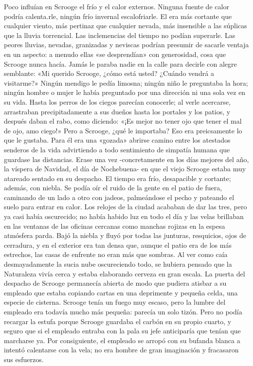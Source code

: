 \documentclass{novela}
\begin{document}
 Poco influían en Scrooge el frío y el calor externos. Ninguna fuente de calor podría calenta.rle, ningún frío invernal escalofriarle. El era más cortante que cualquier viento, más pertinaz que cualquier nevada, más insensible a las súplicas que la lluvia torrencial. Las inclemencias del tiempo no podían superarle. Las peores lluvias, nevadas, granizadas y neviscas podrían presumir de sacarle ventaja en un aspecto: a menudo ellas «se desprendían» con generosidad, cosa que Scrooge nunca hacía.
 Jamás le paraba nadie en la calle para decirle con alegre semblante: «Mi querido Scrooge, ¿cómo está usted? ¿Cuándo vendrá a visitarme?» Ningún mendigo le pedía limosna; ningún niño le preguntaba la hora; ningún hombre o mujer le había preguntado por una dirección ni una sola vez en su vida. Hasta los perros de los ciegos parecían conocerle; al verle acercarse, arrastraban precipitadamente a sus dueños hasta los portales y los patios, y después daban el rabo, como diciendo: «¡Es mejor no tener ojo que tener el mal de ojo, amo ciego!»
 Pero a Scrooge, ¿qué le importaba? Eso era preicsamente lo que le gustaba. Para él era una «gozada» abrirse camino entre los atestados senderos de la vida advirtiendo a todo sentimiento de simpatía humana que guardase las distancias.
 Erase una vez -concretamente en los días mejores del año, la víspera de Navidad, el día de Nochebuena- en que el viejo Scrooge estaba muy atareado sentado en su despacho. El tiempo era frío, desapacible y cortante; además, con niebla. Se podía oír el ruido de la gente en el patio de fuera, caminando de un lado a otro con jadeos, palmeándose el pecho y pateando el suelo para entrar en calor. Los relojes de la ciudad acababan de dar las tres, pero ya casi había oscurecido; no había habido luz en todo el día y las velas brillaban en las ventanas de las oficinas cercanas como manchas rojizas en la espesa atmósfera parda. Bajó la niebla y fluyó por todas las junturas, resquicios, ojos de cerradura, y en el exterior era tan densa que, aunque el patio era de los más estrechos, las casas de enfrente no eran más que sombras. Al ver como caía desmayadamente la sucia nube oscureciendo todo, se hubiera pensado que la Naturaleza vivía cerca y estaba elaborando cerveza en gran escala.
 La puerta del despacho de Scrooge permanecía abierta de modo que pudiera atisbar a su empleado que estaba copiando cartas en una deprimente y pequeña celda, una especie de cisterna. Scrooge tenía un fuego muy escaso, pero la lumbre del empleado era todavía mucho más pequeña: parecía un solo tizón. Pero no podía recargar la estufa porque Scrooge guardaba el carbón en su propio cuarto, y seguro que si el empleado entraba con la pala su jefe anticiparía que tenían que marcharse ya. Por consiguiente, el empleado se arropó con su bufanda blanca a intentó calentarse con la vela; no era hombre de gran imaginación y fracasaron sus esfuerzos.
\end{document}

